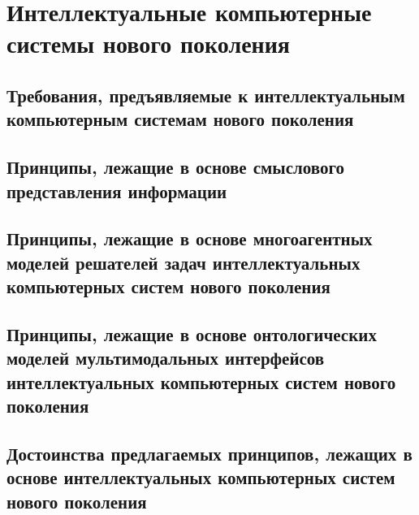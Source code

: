 \chapter{Интеллектуальные компьютерные системы нового поколения}
\label{chapter_new_generation_systems} 


\section{Требования, предъявляемые к интеллектуальным компьютерным системам нового поколения}
\section{Принципы, лежащие в основе смыслового представления информации}
\section{Принципы, лежащие в основе многоагентных моделей решателей задач интеллектуальных компьютерных систем нового поколения}
\section{Принципы, лежащие в основе онтологических моделей мультимодальных интерфейсов интеллектуальных компьютерных систем нового поколения}
\section{Достоинства предлагаемых принципов, лежащих в основе интеллектуальных компьютерных систем нового поколения}

%